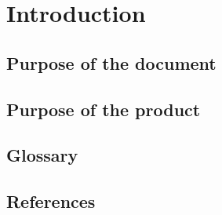 \section{Introduction}

	\subsection{Purpose of the document}
	
	
	\subsection{Purpose of the product}
	
	
	\subsection{Glossary}
	
	
	\subsection{References}